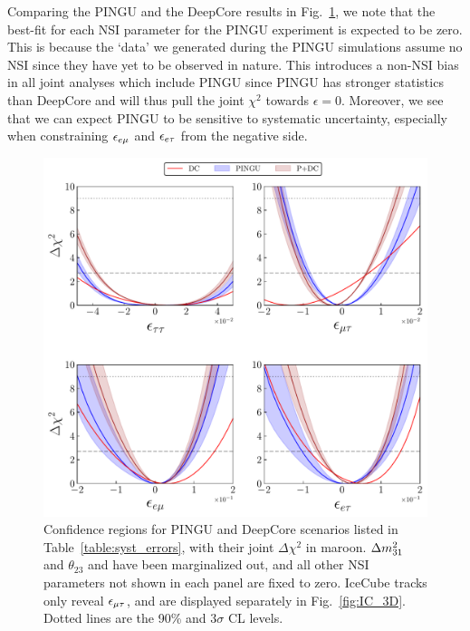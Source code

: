 {Comparing the PINGU and the DeepCore results in Fig.~\ref{fig:3D_NO}, we note that the best-fit for each NSI parameter for the PINGU experiment is expected to be zero. This is because the `data' we generated during 
the PINGU simulations assume no NSI since they have yet to be observed in nature. This introduces a non-NSI bias in all joint analyses which include PINGU
since PINGU has stronger statistics than DeepCore and will thus pull the joint $\chi^2$ towards $\epsilon =0$.
Moreover, we see that we can expect PINGU to be sensitive to systematic uncertainty, especially when constraining $\epsilon_{e\mu}$ and $\epsilon_{e\tau}$ from the negative side.

\begin{figure}
   \begin{center}
      \includegraphics[scale = 0.7]{figures/joint_3D_NO.pdf}
      \caption{Confidence regions for PINGU and DeepCore scenarios listed in Table~\ref{table:syst_errors}, with their joint $\Delta \chi^2$ in maroon. $\dm[31]$ and $\theta_{23}$ and have been marginalized out, and all other NSI 
      parameters not shown in each panel are fixed to zero. 
      IceCube tracks only reveal $\epsilon_{\mu\tau}$, and are displayed separately in Fig.~\ref{fig:IC_3D}. Dotted lines are the 90\% and $3\sigma$ CL levels.}\label{fig:3D_NO}
   \end{center}
\end{figure} 
\begin{figure}

\end{figure}}

